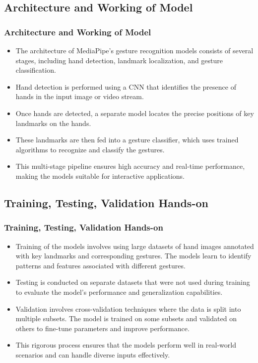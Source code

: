 \documentclass[aspectratio=169, hideothersubsections]{beamer}
\begin{document}
\subsection{Architecture and Working of Model}
\begin{frame}
    \frametitle{Architecture and Working of Model}
    \begin{itemize}
        \item The architecture of MediaPipe's gesture recognition models consists of several stages, including hand detection, landmark localization, and gesture classification.
        \item Hand detection is performed using a CNN that identifies the presence of hands in the input image or video stream.
        \item Once hands are detected, a separate model locates the precise positions of key landmarks on the hands.
        \item These landmarks are then fed into a gesture classifier, which uses trained algorithms to recognize and classify the gestures.
        \item This multi-stage pipeline ensures high accuracy and real-time performance, making the models suitable for interactive applications.
    \end{itemize}
\end{frame}

\subsection{Training, Testing, Validation Hands-on}
\begin{frame}
    \frametitle{Training, Testing, Validation Hands-on}
    \begin{itemize}
        \item Training of the models involves using large datasets of hand images annotated with key landmarks and corresponding gestures. The models learn to identify patterns and features associated with different gestures.
        \item Testing is conducted on separate datasets that were not used during training to evaluate the model's performance and generalization capabilities.
        \item Validation involves cross-validation techniques where the data is split into multiple subsets. The model is trained on some subsets and validated on others to fine-tune parameters and improve performance.
        \item This rigorous process ensures that the models perform well in real-world scenarios and can handle diverse inputs effectively.
    \end{itemize}
\end{frame}
\end{document}
